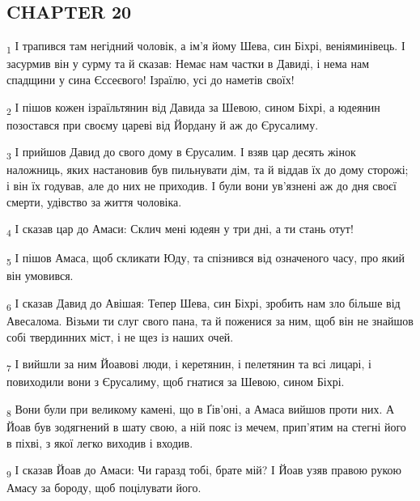 \subsection{CHAPTER 20}
\begin{tcolorbox}
\textsubscript{1} І трапився там негідний чоловік, а ім'я йому Шева, син Біхрі, веніяминівець. І засурмив він у сурму та й сказав: Немає нам частки в Давиді, і нема нам спадщини у сина Єссеєвого! Ізраїлю, усі до наметів своїх!
\end{tcolorbox}
\begin{tcolorbox}
\textsubscript{2} І пішов кожен ізраїльтянин від Давида за Шевою, сином Біхрі, а юдеянин позостався при своєму цареві від Йордану й аж до Єрусалиму.
\end{tcolorbox}
\begin{tcolorbox}
\textsubscript{3} І прийшов Давид до свого дому в Єрусалим. І взяв цар десять жінок наложниць, яких настановив був пильнувати дім, та й віддав їх до дому сторожі; і він їх годував, але до них не приходив. І були вони ув'язнені аж до дня своєї смерти, удівство за життя чоловіка.
\end{tcolorbox}
\begin{tcolorbox}
\textsubscript{4} І сказав цар до Амаси: Склич мені юдеян у три дні, а ти стань отут!
\end{tcolorbox}
\begin{tcolorbox}
\textsubscript{5} І пішов Амаса, щоб скликати Юду, та спізнився від означеного часу, про який він умовився.
\end{tcolorbox}
\begin{tcolorbox}
\textsubscript{6} І сказав Давид до Авішая: Тепер Шева, син Біхрі, зробить нам зло більше від Авесалома. Візьми ти слуг свого пана, та й поженися за ним, щоб він не знайшов собі твердинних міст, і не щез із наших очей.
\end{tcolorbox}
\begin{tcolorbox}
\textsubscript{7} І вийшли за ним Йоавові люди, і керетянин, і пелетянин та всі лицарі, і повиходили вони з Єрусалиму, щоб гнатися за Шевою, сином Біхрі.
\end{tcolorbox}
\begin{tcolorbox}
\textsubscript{8} Вони були при великому камені, що в Ґів'оні, а Амаса вийшов проти них. А Йоав був зодягнений в шату свою, а ній пояс із мечем, прип'ятим на стегні його в піхві, з якої легко виходив і входив.
\end{tcolorbox}
\begin{tcolorbox}
\textsubscript{9} І сказав Йоав до Амаси: Чи гаразд тобі, брате мій? І Йоав узяв правою рукою Амасу за бороду, щоб поцілувати його.
\end{tcolorbox}
